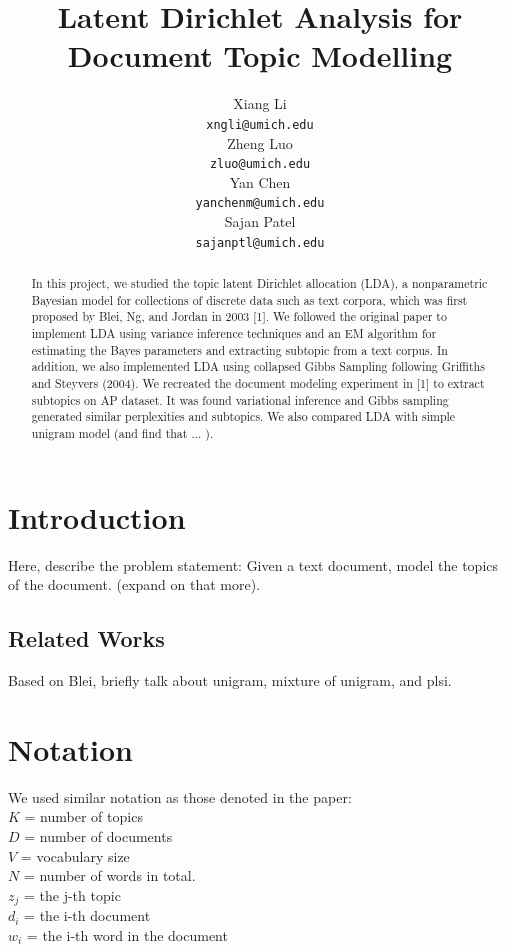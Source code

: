 \documentclass{article} %
\title{Latent Dirichlet Analysis for Document Topic Modelling}
\author{
Xiang Li\\
\texttt{xngli@umich.edu} \\
\And
Zheng Luo \\
\texttt{zluo@umich.edu} \\
\AND
Yan Chen\\
\texttt{yanchenm@umich.edu} \\
\And
Sajan Patel\\
\texttt{sajanptl@umich.edu} \\
}
\begin{document}
\maketitle

\begin{abstract}
In this project, we studied the topic latent Dirichlet allocation (LDA), a nonparametric Bayesian model for collections of discrete data such as text corpora, which was first proposed by Blei, Ng, and Jordan in 2003 [1]. We followed the original paper to implement LDA using variance inference techniques and an EM algorithm for estimating the Bayes parameters and extracting subtopic from a text corpus. In addition, we also implemented LDA using collapsed Gibbs Sampling following Griffiths and Steyvers (2004). We recreated the document modeling experiment in [1] to extract subtopics on AP dataset. It was found variational inference and Gibbs sampling generated similar perplexities and subtopics. We also compared LDA with simple unigram model (and find that ... ).

\end{abstract}

\section{Introduction}
Here, describe the problem statement: Given a text document, model the topics of the document. (expand on that more).

\subsection{Related Works}
Based on Blei, briefly talk about unigram, mixture of unigram, and plsi.

\section{Notation}
We used similar notation as those denoted in the paper: \\
$K$ = number of topics\\
$D$ = number of documents\\
$V$ = vocabulary size\\
$N$ =  number of words in total.\\
$z_j$ = the j-th topic\\
$d_i$ = the i-th document\\
$w_i$ = the i-th word in the document\\
\end{document}
